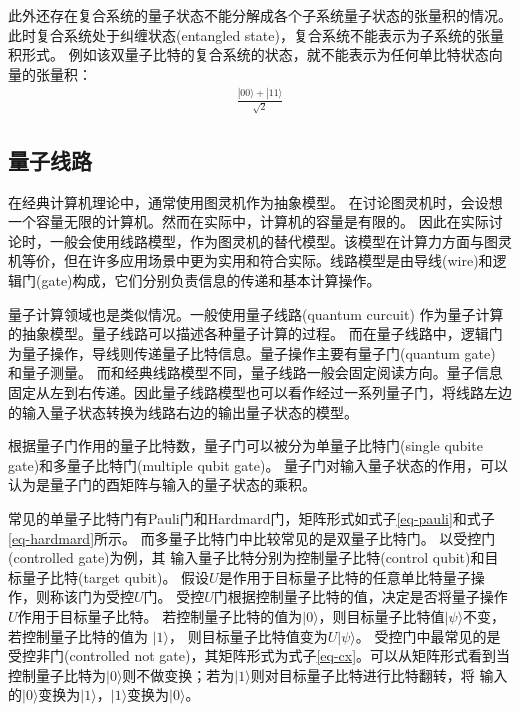 此外还存在复合系统的量子状态不能分解成各个子系统量子状态的张量积的情况。此时复合系统处于纠缠状态(entangled state)，复合系统不能表示为子系统的张量积形式。
例如该双量子比特的复合系统的状态，就不能表示为任何单比特状态向量的张量积：
\begin{align}
    \frac{|00\rangle+|11\rangle}{\sqrt{2}}
\end{align}
\subsection{量子线路}
\label{sec-cir}
在经典计算机理论中，通常使用图灵机作为抽象模型。
在讨论图灵机时，会设想一个容量无限的计算机。然而在实际中，计算机的容量是有限的。
因此在实际讨论时，一般会使用线路模型，作为图灵机的替代模型。该模型在计算力方面与图灵机等价，但在许多应用场景中更为实用和符合实际。线路模型是由导线(wire)和逻辑门(gate)构成，它们分别负责信息的传递和基本计算操作。

量子计算领域也是类似情况。一般使用量子线路(quantum curcuit) 作为量子计算的抽象模型。量子线路可以描述各种量子计算的过程。
而在量子线路中，逻辑门为量子操作，导线则传递量子比特信息。量子操作主要有量子门(quantum gate) 和量子测量。
而和经典线路模型不同，量子线路一般会固定阅读方向。量子信息固定从左到右传递。因此量子线路模型也可以看作经过一系列量子门，将线路左边的输入量子状态转换为线路右边的输出量子状态的模型。

根据量子门作用的量子比特数，量子门可以被分为单量子比特门(single qubite gate)和多量子比特门(multiple qubit gate)。
量子门对输入量子状态的作用，可以认为是量子门的酉矩阵与输入的量子状态的乘积。

常见的单量子比特门有Pauli门和Hardmard门，矩阵形式如式子\ref{eq-pauli}和式子\ref{eq-hardmard}所示。
而多量子比特门中比较常见的是双量子比特门。
以受控门(controlled gate)为例，其
输入量子比特分别为控制量子比特(control qubit)和目标量子比特(target qubit)。
假设$U $是作用于目标量子比特的任意单比特量子操作，则称该门为受控$U$门。
受控$U$门根据控制量子比特的值，决定是否将量子操作$U$作用于目标量子比特。
若控制量子比特的值为\(|0\rangle\)，则目标量子比特值\(|\psi\rangle\)不变，若控制量子比特的值为
\(|1\rangle\)， 则目标量子比特值变为\(U|\psi\rangle\)。
受控门中最常见的是受控非门(controlled not gate)，其矩阵形式为式子\ref{eq-cx}。可以从矩阵形式看到当控制量子比特为\(|0\rangle\)则不做变换；若为\(|1\rangle\)则对目标量子比特进行比特翻转，将
输入的\(|0\rangle\)变换为\(|1\rangle\)，\(|1\rangle\)变换为\(|0\rangle\)。

